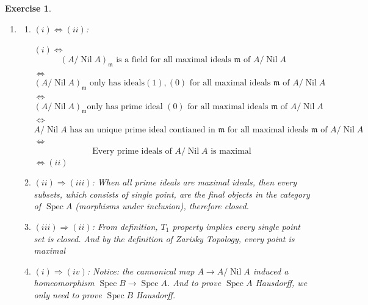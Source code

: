 \documentclass{article}
\theoremstyle{breakstyle}
\newtheorem{exercise}{Exercise}
\DeclareMathOperator{\nil}{Nil}
\DeclareMathOperator{\spec}{Spec}
\begin{document}
\begin{exercise}
    \leavevmode \vspace{-\baselineskip}
    \begin{enumerate}[label=({\Roman*})]
        \item 
            \begin{enumerate}[label=({\alph*})]
                \item $(i)\Leftrightarrow (ii)$:

                    $(i)\Leftrightarrow $
                    $$
                    \left( A/\nil{A} \right) _{\mathfrak{m}} \text{ is a field for all maximal ideals  }\mathfrak{m}\text{ of }A / \nil{A}
                    $$
                    $\Leftrightarrow $
                    $$
                    \left( A / \nil{A} \right) _{\mathfrak{m}}\text{ only has ideals}(1),(0)\text{ for all maximal ideals  }\mathfrak{m}\text{ of }A / \nil{A}
                    $$
                    $\Leftrightarrow $
                    $$
                    \left( A / \nil{A} \right) _{\mathfrak{m}}\text{only has prime ideal }(0)\text{ for all maximal ideals  }\mathfrak{m}\text{ of }A / \nil{A}
                    $$
                    $\Leftrightarrow $
                    $$
                    A / \nil{A}\text{ has an unique prime ideal contianed in }\mathfrak{m}\text{ for all maximal ideals  }\mathfrak{m}\text{ of }A / \nil{A}
                    $$
                    $\Leftrightarrow $
                    $$
                    \text{Every prime ideals of }A / \nil{A}\text{ is maximal }
                    $$
                    $\Leftrightarrow (ii)$
                \item $(ii)\Rightarrow (iii)$:
                    When all prime ideals are maximal ideals,
                    then every subsets, which consists of single point, are the final objects in the category of $\spec{A}$ (morphisms under inclusion),
                    therefore closed.
                \item $(iii)\Rightarrow (ii)$: 
                    From definition,
                    $T_{1}$ property implies every single point set is closed.
                    And by the definition of \emph{Zarisky Topology}, every point is maximal
                \item $(i)\Rightarrow (iv)$:
                    Notice: the cannonical map $A\longrightarrow A / \nil{A}$ induced a homeomorphism $\spec{B}\longrightarrow \spec{A}$.
                    And to prove $\spec{A}$ Hausdorff, we only need to prove $\spec{B}$ Hausdorff.


\end{enumerate}
\end{enumerate}
\end{exercise}
\end{document}

